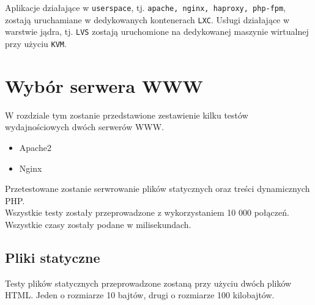 Aplikacje działające w \texttt{userspace}, tj. \texttt{apache, nginx, haproxy, php-fpm}, zostają uruchamiane w dedykowanych kontenerach \texttt{LXC}.
Usługi działające w warstwie jądra, tj. \texttt{LVS} zostają uruchomione na dedykowanej maszynie wirtualnej przy użyciu \texttt{KVM}.
\section{Wybór serwera WWW}
W rozdziale tym zostanie przedstawione zestawienie kilku testów wydajnościowych dwóch serwerów WWW.
\begin{itemize}
\item Apache2
\item Nginx
\end{itemize}
Przetestowane zostanie serwrowanie plików statycznych oraz treści dynamicznych PHP{.}\\
Wszystkie testy zostały przeprowadzone z wykorzystaniem 10 000 połączeń.\\
Wszystkie czasy zostały podane w milisekundach.
\subsection{Pliki statyczne}
Testy plików statycznych przeprowadzone zostaną przy użyciu dwóch plików HTML{.}
Jeden o rozmiarze 10 bajtów, drugi o rozmiarze 100 kilobajtów.

